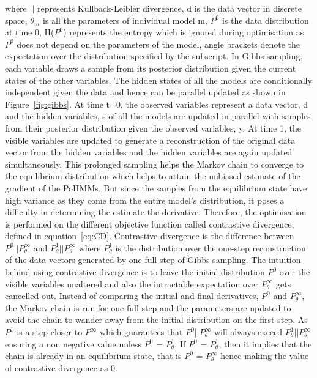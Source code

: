 \documentclass[conference]{IEEEtran}
\begin{document}
where $||$ represents Kullback-Leibler divergence, d is the data vector in discrete space, $\theta_m$ is all the parameters of individual model m, $P^0$ is the data distribution at time $0$, H($P^0$) represents the entropy which is ignored during optimisation as $P^0$ does not depend on the parameters of the model, angle brackets denote the expectation over the distribution specified by the subscript.
In Gibbs sampling, each variable draws a sample from its posterior distribution given the current states of the other variables. The hidden states of all the models are conditionally independent given the data and hence can be parallel updated as shown in Figure~\ref{fig:gibbs}. At time t=0, the observed variables represent a data vector, d and the hidden variables, s of all the models are updated in parallel with samples from their posterior distribution given the observed variables, y. At time 1, the visible variables are updated to generate a reconstruction of the original data vector from the hidden variables and the hidden variables are again updated simultaneously. This prolonged sampling helps the Markov chain to converge to the equilibrium distribution which helps to attain the unbiased estimate of the gradient of the PoHMMs. But since the samples from the equilibrium state have high variance as they come from the entire model's distribution, it poses a difficulty in determining the estimate the derivative. Therefore, the optimisation is performed on the different objective function called contrastive divergence, defined in equation~\ref{eq:CD}. Contrastive divergence is the difference between $P^0 || P^\infty_\theta$ and $P^1_\theta || P^\infty_\theta$ where $P^1_\theta$ is the distribution over the one-step reconstruction of the data vectors generated by one full step of Gibbs sampling. The intuition behind using contrastive divergence is to leave the initial distribution $P^{0}$ over the visible variables unaltered and also the intractable expectation over $P^\infty_\theta$ gets cancelled out. Instead of comparing the initial and final derivatives, $P^0$ and $P^\infty_\theta$, the Markov chain is run for one full step and the parameters are updated to avoid the chain to wander away from the initial distribution on the first step. As $P^1$ is a step closer to $P^\infty$ which guarantees that $P^0 || P^\infty_\theta$ will always exceed $P^1_\theta || P^\infty_\theta$ ensuring a non negative value unless $P^0$ = $P^1_\theta$. If $P^0$ = $P^1_\theta$, then it implies that the chain is already in an equilibrium state, that is $P^0$ = $P^\infty_\theta$ hence making the value of contrastive divergence as $0$.
\end{document}
